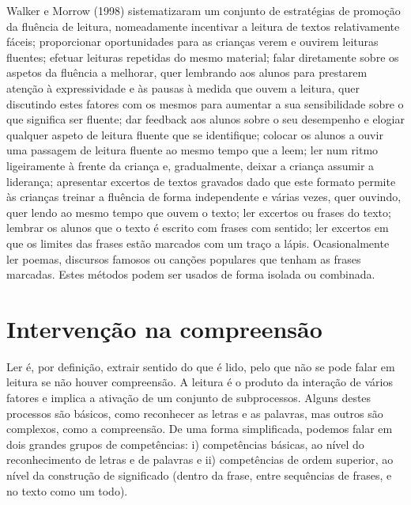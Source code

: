 \documentclass[
  oneside,
  11pt, a4paper,
  footinclude=true,
  headinclude=true,
  cleardoublepage=empty
]{scrbook}
\begin{document}
Walker e Morrow (1998) sistematizaram um conjunto de estratégias de promoção da fluência de leitura, nomeadamente incentivar a leitura de textos relativamente fáceis; proporcionar oportunidades para as crianças verem e ouvirem leituras fluentes; efetuar leituras repetidas do mesmo material; falar diretamente sobre os aspetos da fluência a melhorar, quer lembrando aos alunos para prestarem atenção à expressividade e às pausas à medida que ouvem a leitura, quer discutindo estes fatores com os mesmos para aumentar a sua sensibilidade sobre o que significa ser fluente; dar feedback aos alunos sobre o seu desempenho e elogiar qualquer aspeto de leitura fluente que se identifique; colocar os alunos a ouvir uma passagem de leitura fluente ao mesmo tempo que a leem; ler num ritmo  ligeiramente à frente da criança e,  gradualmente, deixar  a criança assumir a liderança; apresentar excertos de textos gravados dado que este formato permite às crianças treinar a fluência de forma independente e várias vezes, quer ouvindo, quer lendo ao mesmo tempo que ouvem o texto; ler excertos ou frases do texto; lembrar os alunos que o texto é escrito com frases com sentido; ler excertos em que os limites das frases estão marcados com um traço a lápis. Ocasionalmente ler poemas, discursos famosos ou canções populares que tenham as frases marcadas. Estes métodos podem ser usados de forma isolada ou combinada.

\section{Intervenção na compreensão}

Ler é, por definição, extrair sentido do que é lido, pelo que não se pode falar em leitura se não houver compreensão. A leitura é o produto da interação de vários fatores e implica a ativação de um conjunto de subprocessos. Alguns destes processos são básicos, como reconhecer as letras e as palavras, mas outros são complexos, como a compreensão. De uma forma simplificada, podemos falar em dois grandes grupos de competências: i) competências básicas, ao nível do reconhecimento de letras e de palavras e ii) competências de ordem superior, ao nível da construção de significado (dentro da frase, entre sequências de frases, e no texto como um todo).
\end{document}
